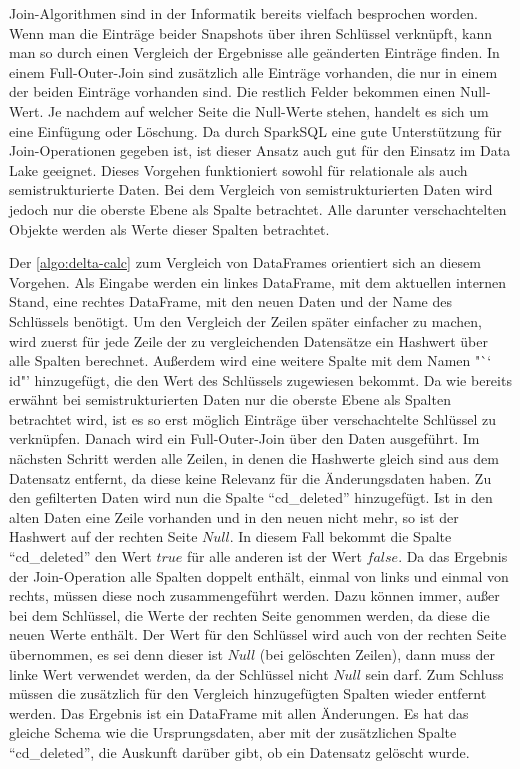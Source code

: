Join-Algorithmen sind in der Informatik bereits vielfach besprochen worden.
Wenn man die Einträge beider Snapshots über ihren Schlüssel verknüpft, kann man so durch einen Vergleich der Ergebnisse alle geänderten Einträge finden.
In einem Full-Outer-Join sind zusätzlich alle Einträge vorhanden, die nur in einem der beiden Einträge vorhanden sind.
Die restlich Felder bekommen einen Null-Wert.
Je nachdem auf welcher Seite die Null-Werte stehen, handelt es sich um eine Einfügung oder Löschung.
Da durch SparkSQL eine gute Unterstützung für Join-Operationen gegeben ist, ist dieser Ansatz auch gut für den Einsatz im Data Lake geeignet.
Dieses Vorgehen funktioniert sowohl für relationale als auch semistrukturierte Daten.
Bei dem Vergleich von semistrukturierten Daten wird jedoch nur die oberste Ebene als Spalte betrachtet.
Alle darunter verschachtelten Objekte werden als Werte dieser Spalten betrachtet.

Der \cref{algo:delta-calc} zum Vergleich von DataFrames orientiert sich an diesem Vorgehen.
Als Eingabe werden ein linkes DataFrame, mit dem aktuellen internen Stand, eine rechtes DataFrame, mit den neuen Daten und der Name des Schlüssels benötigt.
Um den Vergleich der Zeilen später einfacher zu machen, wird zuerst für jede Zeile der zu vergleichenden Datensätze ein Hashwert über alle Spalten berechnet.
Außerdem wird eine weitere Spalte mit dem Namen "`\char`~ id"' hinzugefügt, die den Wert des Schlüssels zugewiesen bekommt.
Da wie bereits erwähnt bei semistrukturierten Daten nur die oberste Ebene als Spalten betrachtet wird, ist es so erst möglich  Einträge über verschachtelte Schlüssel zu verknüpfen.
Danach wird ein Full-Outer-Join über den Daten ausgeführt.
Im nächsten Schritt werden alle Zeilen, in denen die Hashwerte gleich sind aus dem Datensatz entfernt, da diese keine Relevanz für die Änderungsdaten haben.
Zu den gefilterten Daten wird nun die Spalte "`cd\_deleted"' hinzugefügt.
Ist in den alten Daten eine Zeile vorhanden und in den neuen nicht mehr, so ist der Hashwert auf der rechten Seite $Null$.
In diesem Fall bekommt die Spalte "`cd\_deleted"' den Wert $true$ für alle anderen ist der Wert $false$.
Da das Ergebnis der Join-Operation alle Spalten doppelt enthält, einmal von links und einmal von rechts, müssen diese noch zusammengeführt werden.
Dazu können immer, außer bei dem Schlüssel, die Werte der rechten Seite genommen werden, da diese die neuen Werte enthält.
Der Wert für den Schlüssel wird auch von der rechten Seite übernommen, es sei denn dieser ist $Null$ (bei gelöschten Zeilen), dann muss der linke Wert verwendet werden, da der Schlüssel nicht $Null$ sein darf.
Zum Schluss müssen die zusätzlich für den Vergleich hinzugefügten Spalten wieder entfernt werden.
Das Ergebnis ist ein DataFrame mit allen Änderungen.
Es hat das gleiche Schema wie die Ursprungsdaten, aber mit der zusätzlichen Spalte "`cd\_deleted"', die Auskunft darüber gibt, ob ein Datensatz gelöscht wurde.

